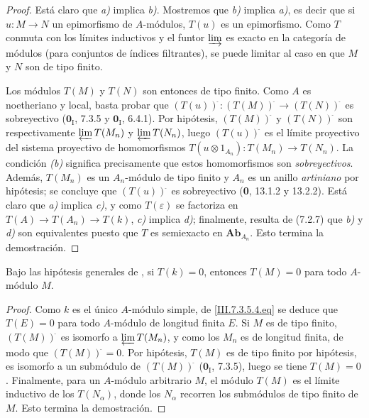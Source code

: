 \begin{proof}
Está claro que \emph{a)} implica \emph{b)}. Mostremos que \emph{b)} implica \emph{a)}, es decir que si $u:M\to N$ un epimorfismo de $A$-módulos, $T(u)$
es un epimorfismo. Como $T$ conmuta con los límites inductivos y el funtor $\varinjlim$ es
exacto en la categoría de módulos (para conjuntos de índices filtrantes),
se puede limitar al caso en que $M$ y $N$ son de tipo
finito.

Los módulos $T(M)$ y $T(N)$ son entonces de tipo finito. Como $A$ es
noetheriano y local, basta probar que
$(T(u))^{\widehat{\,}}:(T(M))^{\widehat{\,}}\longrightarrow(T(N))^{\widehat{\,}}$
es sobreyectivo ($\mathbf{0}_{\mathrm I}$, 7.3.5 y $\mathbf{0}_{\mathrm I}$, 6.4.1). Por hipótesis,
$(T(M))^{\widehat{\,}}$ y $(T(N))^{\widehat{\,}}$ son respectivamente $\varprojlim T(M_n)$
y $\varprojlim T(N_n)$, luego $(T(u))^{\widehat{\,}}$ es el límite proyectivo del sistema proyectivo de
homomorfismos
$T(u\otimes1_{A_n}):T(M_n)\longrightarrow T(N_n)$.
La condición \emph{(b)} significa precisamente que estos homomorfismos son
\emph{sobreyectivos}. Además, $T(M_n)$ es un $A_n$-módulo de tipo finito y
$A_n$ es un anillo \emph{artiniano} por hipótesis; se concluye que $(T(u))^{\widehat{\,}}$ es sobreyectivo (\textbf{0}, 13.1.2 y
13.2.2). Está claro que \emph{a)} implica \emph{c)}, y como $T(\varepsilon)$ se factoriza
en
$T(A)\longrightarrow T(A_n)\longrightarrow T(k)$,
\emph{c)} implica \emph{d)}; finalmente, resulta de (7.2.7) que \emph{b)} y \emph{d)} son equivalentes
puesto que $T$ es
semiexacto en $\boldsymbol{Ab}_{A_n}$. Esto termina la demostración.
\end{proof}

\begin{corollary}[7.5.3]
\label{III.7.5.3}
Bajo las hipótesis generales de , si $T(k)=0$,
entonces $T(M)=0$ para todo $A$-módulo $M$.
\end{corollary}

\begin{proof}
Como $k$ es el único $A$-módulo simple, de
\eqref{III.7.3.5.4.eq} se deduce que $T(E)=0$ para todo $A$-módulo
de longitud finita $E$. Si $M$ es de tipo finito,
$(T(M))^{\widehat{\,}}$ es isomorfo a $\varprojlim T(M_n)$, y como los $M_n$ es de longitud finita, de modo que
$(T(M))^{\widehat{\,}}=0$. Por hipótesis, $T(M)$ es de tipo finito por hipótesis, es isomorfo a un submódulo de $(T(M))^{\widehat{\,}}$
($\mathbf{0}_{\mathrm I}$, 7.3.5), luego se tiene $T(M)=0$. Finalmente, para un $A$-módulo arbitrario $M$, el módulo
$T(M)$ es el límite inductivo de los $T(N_\alpha)$, donde los
$N_\alpha$ recorren los submódulos de tipo finito de $M$. Esto
termina la demostración.
\end{proof}

